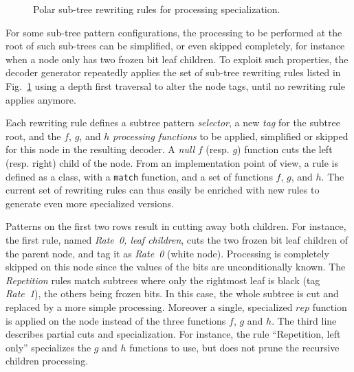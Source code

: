 \begin{figure}[htp]

  \caption{Polar sub-tree rewriting rules for processing specialization.}
  \label{fig:polar_patterns}
\end{figure}

For some sub-tree pattern configurations, the processing to be performed at the
root of such sub-trees can be simplified, or even skipped completely, for
instance when a node only has two frozen bit leaf children. To exploit such
properties, the decoder generator repeatedly applies the set of sub-tree
rewriting rules listed in Fig.~\ref{fig:polar_patterns} using a depth first
traversal to alter the node tags, until no rewriting rule applies anymore.

Each rewriting rule defines a subtree pattern \emph{selector}, a new \emph{tag}
for the subtree root, and the $f$, $g$, and $h$ \emph{processing functions} to
be applied, simplified or skipped for this node in the resulting decoder. A
\emph{null} $f$ (resp. $g$) function cuts the left (resp. right) child of the
node. From an implementation point of view, a rule is defined as a class, with a
\verb|match| function, and a set of functions $f$, $g$, and $h$. The current
set of rewriting rules can thus easily be enriched with new rules to generate
even more specialized versions.

Patterns on the first two rows result in cutting away both children. For
instance, the first rule, named \emph{Rate~0, leaf children}, cuts the two
frozen bit leaf children of the parent node, and tag it as \emph{Rate~0} (white
node). Processing is completely skipped on this node since the values of the
bits are unconditionally known. The \emph{Repetition} rules match subtrees where
only the rightmost leaf is black (tag \emph{Rate~1}), the others being frozen
bits. In this case, the whole subtree is cut and replaced by a more simple
processing. Moreover a single, specialized $rep$ function is applied on the node
instead of the three functions $f$, $g$ and $h$. The third line describes
partial cuts and specialization. For instance, the rule ``Repetition, left
only'' specializes the $g$ and $h$ functions to use, but does not prune the
recursive children processing.

